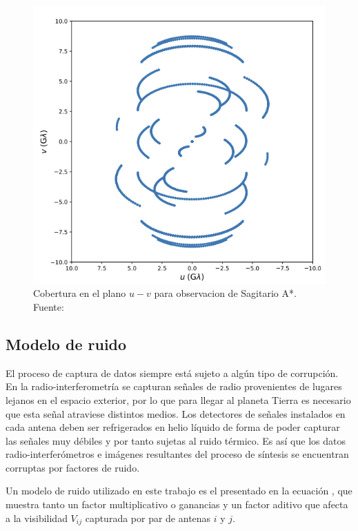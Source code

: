 \begin{figure}[!ht]
	\centering
	\captionsetup{justification=centering}
	\includegraphics[scale=0.6]{images/uv_coverage.png}
	\caption[Cobertura en el plano $u-v$ para Sagitario A*.]{Cobertura en el plano $u-v$ para observacion de Sagitario A*. Fuente: \citep{Chael_2018}}
	\label{fig:uv_coverage}
\end{figure}

\subsection{Modelo de ruido}

El proceso de captura de datos siempre está sujeto a algún tipo de corrupción. En la radio-interferometría se capturan señales de radio provenientes de lugares lejanos en el espacio exterior, por lo que para llegar al planeta Tierra es necesario que esta señal atraviese distintos medios. Los detectores de señales instalados en cada antena deben ser refrigerados en helio líquido de forma de poder capturar las señales muy débiles \citep{Receivers} y por tanto sujetas al ruido térmico. Es así que los datos radio-interferómetros e imágenes resultantes del proceso de síntesis se encuentran corruptas por factores de ruido. 

Un modelo de ruido \citep{synthesis} utilizado en este trabajo es el presentado en la ecuación , que muestra tanto un factor multiplicativo o ganancias y un factor aditivo que afecta a la visibilidad $V_{ij}$ capturada por par de antenas $i$ y $j$. 

